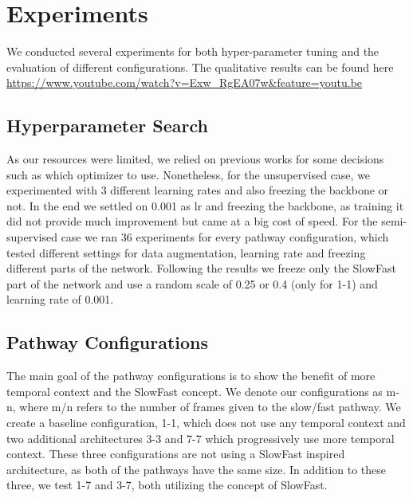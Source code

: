 \section{Experiments}
We conducted several experiments for both hyper-parameter tuning and the evaluation of different configurations.
The qualitative results can be found here \url{https://www.youtube.com/watch?v=Exw_RgEA07w&feature=youtu.be}

\subsection{Hyperparameter Search}
As our resources were limited, we relied on previous works for some decisions such as which optimizer to use. Nonetheless, for the unsupervised case, we experimented with 3 different learning rates and also freezing the backbone or not. In the end we settled on 0.001 as lr and freezing the backbone, as training it did not provide much improvement but came at a big cost of speed. For the semi-supervised case we ran 36 experiments for every pathway configuration, which tested different settings for data augmentation, learning rate and freezing different parts of the network. Following the results we freeze only the SlowFast part of the network and use a random scale of 0.25 or 0.4 (only for 1-1) and learning rate of 0.001.

\subsection{Pathway Configurations}
The main goal of the pathway configurations is to show the benefit of more temporal context and the SlowFast concept. We denote our configurations as m-n, where m/n refers to the number of frames given to the slow/fast pathway.
We create a baseline configuration, 1-1, which does not use any temporal context and two additional architectures 3-3 and 7-7 which progressively use more temporal context. These three configurations are not using a SlowFast inspired architecture, as both of the pathways have the same size. In addition to these three, we test 1-7 and 3-7, both utilizing the concept of SlowFast.


